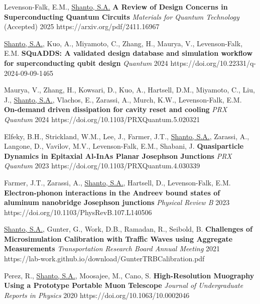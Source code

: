 
\begin{cvpublications}{}

    {Levenson-Falk, E.M., \underline{Shanto, S.A.} \textbf{A Review of Design Concerns in Superconducting Quantum Circuits}}	
    {\textit{Materials for Quantum Technology} (Accepted)}
    {2025}
    {}
    {https://arxiv.org/pdf/2411.16967}

    {\underline{Shanto, S.A.}, Kuo, A., Miyamoto, C., Zhang, H., Maurya, V., Levenson-Falk, E.M. \textbf{SQuADDS: A validated design database and simulation workflow for superconducting qubit design}}	
    {\textit{Quantum}}
    {2024}
    {}
    {https://doi.org/10.22331/q-2024-09-09-1465}

    {Maurya, V., Zhang, H., Kowsari, D., Kuo, A., Hartsell, D.M., Miyamoto, C., Liu, J., \underline{Shanto, S.A.}, Vlachos, E., Zarassi, A., Murch, K.W., Levenson-Falk, E.M. \textbf{On-demand driven dissipation for cavity reset and cooling}}	
    {\textit{PRX Quantum}}
    {2024}
    {}
    {https://doi.org/10.1103/PRXQuantum.5.020321}

    {Elfeky, B.H., Strickland, W.M., Lee, J., Farmer, J.T., \underline{Shanto, S.A.}, Zarassi, A., Langone, D., Vavilov, M.V., Levenson-Falk, E.M., Shabani, J. \textbf{Quasiparticle Dynamics in Epitaxial Al-InAs Planar Josephson Junctions}}	
    {\textit{PRX Quantum}}
    {2023}
    {}
    {https://doi.org/10.1103/PRXQuantum.4.030339}

    {Farmer, J.T., Zarassi, A., \underline{Shanto, S.A.}, Hartsell, D., Levenson-Falk, E.M. \textbf{Electron-phonon interactions in the Andreev bound states of aluminum nanobridge Josephson junctions}}	
    {\textit{Physical Review B}}
    {2023}
    {}
    {https://doi.org/10.1103/PhysRevB.107.L140506}

    {\underline{Shanto, S.A.}, Gunter, G., Work, D.B., Ramadan, R., Seibold, B. \textbf{Challenges of Microsimulation Calibration with Traffic Waves using Aggregate Measurements}}	
    {\textit{Transportation Research Board Annual Meeting}}
    {2021}
    {}
    {https://lab-work.github.io/download/GunterTRBCalibration.pdf}

    {Perez, R., \underline{Shanto, S.A.}, Moosajee, M., Cano, S. \textbf{High-Resolution Muography Using a Prototype Portable Muon Telescope}}	
    {\textit{Journal of Undergraduate Reports in Physics}}
    {2020}
    {}
    {https://doi.org/10.1063/10.0002046}

\end{cvpublications}
